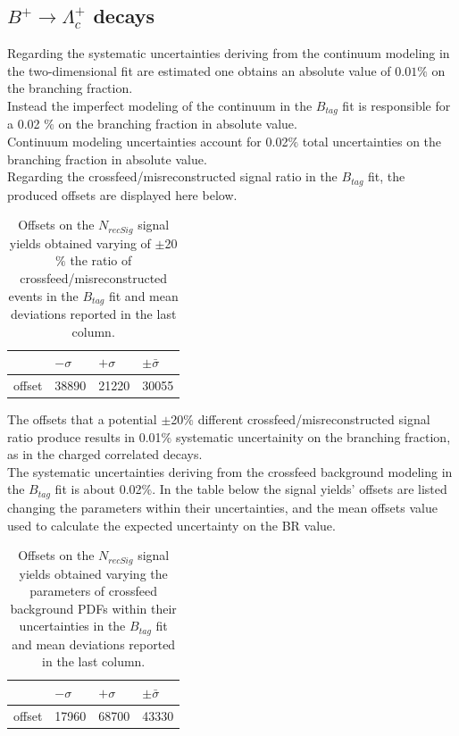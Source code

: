     \subsection{$B^+ \rightarrow \Lambda_c^+$ decays}

    Regarding the systematic uncertainties deriving from the continuum modeling in the two-dimensional fit are estimated 
    one obtains an absolute value of $0.01\%$ on the branching fraction.\\
    Instead the imperfect modeling of the continuum in the $B_{tag}  $ fit is responsible for a 0.02 $\%$ on the branching fraction in absolute value.\\
    Continuum modeling uncertainties account for 0.02$\%$ total uncertainties on the branching fraction in absolute value.\\  
    
    Regarding the crossfeed/misreconstructed signal ratio in the $B_{tag}  $ fit, the produced offsets are displayed here below.
    \vspace{0.25 cm}
    \begin{table}[H]
    \begin{tabular}{ |p{2.5cm}||p{2cm}| p{2cm}|  p{2cm}|}
    \hline
           &  $- \sigma$ &  $+ \sigma$ & $ \pm \bar{\sigma}$\\
     \hline
     offset    &  38890 &  21220 & 30055 \\
     \hline
    \end{tabular}
    \caption{Offsets on the $N_{recSig}$  signal yields obtained varying of $\pm$20$\%$ the 
     ratio of crossfeed/misreconstructed events in the $B_{tag}$ fit and mean deviations reported in the last column.}
    \end{table}

    The offsets that a potential $\pm$20$\%$ different crossfeed/misreconstructed signal ratio produce results in 0.01$\%$ systematic
    uncertainity on the branching fraction, as in the charged correlated decays.\\
    
    The systematic uncertainties deriving from the crossfeed background modeling in the $B_{tag}$ fit is    about 0.02$\%$.
    In the table below the signal yields' offsets are listed changing
    the parameters within their uncertainties, and the mean offsets value used to calculate the
    expected uncertainty on the BR value.
    \vspace{0.25 cm}
    \begin{table}[H]
    \begin{tabular}{ |p{2.5cm}||p{2cm}| p{2cm}|  p{2cm}|}
    \hline
           &  $- \sigma$ &  $+ \sigma$ & $ \pm \bar{\sigma}$\\
     \hline
     offset    &  17960 &  68700 & 43330 \\
     \hline
    \end{tabular}
    \caption{Offsets on the $N_{recSig}$  signal yields  obtained varying the parameters of crossfeed
    background PDFs within their uncertainties in the $B_{tag}$ fit and mean
    deviations reported in the last column. }
    \end{table}

